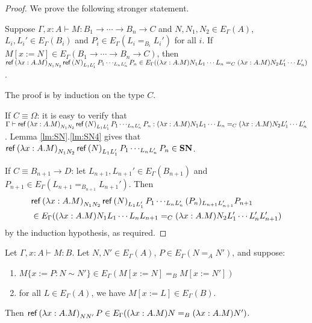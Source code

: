 \begin{proof}
We prove the following stronger statement.

Suppose $\Gamma, x : A \vdash M : B_1 \rightarrow \cdots \rightarrow B_n \rightarrow C$ and $N, N_1, N_2 \in E_\Gamma(A)$,
$L_i, L_i' \in E_\Gamma(B_i)$ and $P_i \in E_\Gamma(L_i =_{B_i} L_i')$ for all $i$.  If $M[x:=N] \in E_\Gamma(B_1 \rightarrow \cdots \rightarrow B_n \rightarrow C)$,
then $\mathsf{ref} \left( {\lambda x:A.M} \right)_{N_1 N_2} \mathsf{ref} \left( {N} \right)_{L_1 L_1'} P_1 \cdots_{L_n L_n'} P_n \in E_\Gamma((\lambda x:A.M) N_1 L_1 \cdots L_n =_C (\lambda x:A.M) N_2 L_1' \cdots L_n')$.

The proof is by induction on the type $C$.

If $C \equiv \Omega$: it is easy to verify that \\ $\Gamma \vdash \mathsf{ref} \left( {\lambda x:A.M} \right)_{N_1 N_2} \mathsf{ref} \left( {N} \right)_{L_1 L_1'} P_1 \cdots_{L_n L_n'} P_n : (\lambda x:A.M) N_1 L_1 \cdots L_n =_C (\lambda x:A.M) N_2 L_1' \cdots L_n'$.  Lemma \ref{lm:SN}.\ref{lm:SN4} gives that \\
$\mathsf{ref} \left( {\lambda x:A.M} \right)_{N_1 N_2} \mathsf{ref} \left( {N} \right)_{L_1 L_1'} P_1 \cdots_{L_n L_n'} P_n \in \mathbf{SN}$.

If $C \equiv B_{n+1} \rightarrow D$: let $L_{n+1}, L_{n+1}' \in E_\Gamma(B_{n+1})$ and $P_{n+1} \in E_\Gamma(L_{n+1} =_{B_{n+1}} L_{n+1}')$.  Then
\begin{align*}
\lefteqn{\reff{\lambda x:A.M}_{N_1 N_2} \reff{N}_{L_1 L_1'} P_1 \cdots_{L_n L_n'} (P_n)_{L_{n+1} L_{n+1}'} P_{n+1}} \\
\quad &\in E_\Gamma((\lambda x:A.M) N_1 L_1 \cdots L_n L_{n+1} =_C (\lambda x:A.M) N_2 L_1' \cdots L_n'
L_{n+1}')
\end{align*}
by the induction hypothesis, as required.
\end{proof}

\begin{lm}
\label{lm:wte4}
Let $\Gamma, x : A \vdash M : B$.  Let $N, N' \in E_\Gamma(A)$, $P \in E_\Gamma(N =_A N')$, and suppose:
\begin{enumerate}
\item
$M\{x:=P:N \sim N'\} \in E_\Gamma(M[x:=N] =_B M[x:=N'])$
\item
for all $L \in E_\Gamma(A)$, we have $M[x:=L] \in E_\Gamma(B)$.
\end{enumerate}
Then $\mathsf{ref} \left( {\lambda x:A.M} \right)_{N N'} P \in E_\Gamma((\lambda x:A.M)N =_B (\lambda x:A.M) N')$.
\end{lm}


